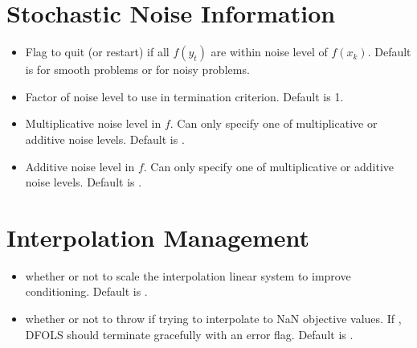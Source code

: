 \documentclass[letterpaper,10pt,english]{sphinxmanual}
\begin{document}
\section{Stochastic Noise Information}
\label{\detokenize{advanced:stochastic-noise-information}}\begin{itemize}
\item {} 
\sphinxAtStartPar
{} \sphinxhyphen{} Flag to quit (or restart) if all \(f(y_t)\) are within noise level of \(f(x_k)\). Default is  for smooth problems or  for noisy problems.

\item {} 
\sphinxAtStartPar
{} \sphinxhyphen{} Factor of noise level to use in termination criterion. Default is 1.

\item {} 
\sphinxAtStartPar
{} \sphinxhyphen{} Multiplicative noise level in \(f\). Can only specify one of multiplicative or additive noise levels. Default is .

\item {} 
\sphinxAtStartPar
{} \sphinxhyphen{} Additive noise level in \(f\). Can only specify one of multiplicative or additive noise levels. Default is .

\end{itemize}


\section{Interpolation Management}
\label{\detokenize{advanced:interpolation-management}}\begin{itemize}
\item {} 
\sphinxAtStartPar
{} \sphinxhyphen{} whether or not to scale the interpolation linear system to improve conditioning. Default is .

\item {} 
\sphinxAtStartPar
{} \sphinxhyphen{} whether or not to throw  if trying to interpolate to NaN objective values. If , DFO\sphinxhyphen{}LS should terminate gracefully with an error flag. Default is .

\end{itemize}
\end{document}

